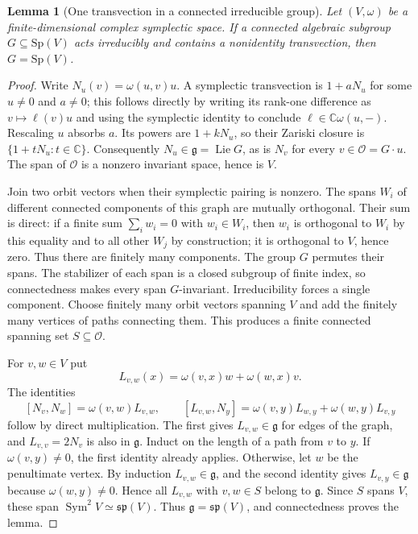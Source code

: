 \documentclass[11pt,a4paper]{article}
\newtheorem{lemma}[theorem]{Lemma}
\theoremstyle{definition}
\theoremstyle{remark}
\numberwithin{equation}{section}
\begin{document}
\begin{lemma}[One transvection in a connected irreducible group]
\label{p6:fe:transvection}
Let $(V,\omega)$ be a finite-dimensional complex symplectic space.
If a connected algebraic subgroup $G\subseteq\mathrm{Sp}(V)$ acts
irreducibly and contains a nonidentity transvection, then
$G=\mathrm{Sp}(V)$.
\end{lemma}
\begin{proof}
Write $N_u(v)=\omega(u,v)u$. A symplectic transvection is
$1+aN_u$ for some $u\ne0$ and $a\ne0$; this follows directly by
writing its rank-one difference as $v\mapsto\ell(v)u$ and using
the symplectic identity to conclude $\ell\in\mathbb C\omega(u,-)$.
Rescaling $u$ absorbs $a$. Its powers are $1+kN_u$, so their
Zariski closure is $\{1+tN_u:t\in\mathbb C\}$.
Consequently $N_u\in\mathfrak g=\operatorname{Lie}G$, as is
$N_v$ for every $v\in\mathcal O=G\cdot u$.
The span of $\mathcal O$ is a nonzero invariant space, hence is $V$.

Join two orbit vectors when their symplectic pairing is nonzero.
The spans $W_i$ of different connected components of this graph
are mutually orthogonal. Their sum is direct: if a finite sum
$\sum_iw_i=0$ with $w_i\in W_i$, then $w_i$ is orthogonal to
$W_i$ by this equality and to all other $W_j$ by construction;
it is orthogonal to $V$, hence zero. Thus there are finitely many
components. The group $G$ permutes their spans. The stabilizer of
each span is a closed subgroup of finite index, so connectedness
makes every span $G$-invariant. Irreducibility forces a single
component. Choose finitely many orbit vectors spanning $V$ and
add the finitely many vertices of paths connecting them. This
produces a finite connected spanning set $S\subseteq\mathcal O$.

For $v,w\in V$ put
\[
 L_{v,w}(x)=\omega(v,x)w+\omega(w,x)v.
\]
The identities
\[
 [N_v,N_w]=\omega(v,w)L_{v,w},\qquad
 [L_{v,w},N_y]=\omega(v,y)L_{w,y}+\omega(w,y)L_{v,y}
 \tag{T}
\]
follow by direct multiplication. The first gives $L_{v,w}\in
\mathfrak g$ for edges of the graph, and $L_{v,v}=2N_v$ is also
in $\mathfrak g$. Induct on the length of a path from $v$ to $y$.
If $\omega(v,y)\ne0$, the first identity already applies. Otherwise,
let $w$ be the penultimate vertex. By induction $L_{v,w}\in
\mathfrak g$, and the second identity gives $L_{v,y}\in\mathfrak g$
because $\omega(w,y)\ne0$. Hence all $L_{v,w}$ with $v,w\in S$
belong to $\mathfrak g$. Since $S$ spans $V$, these span
$\operatorname{Sym}^2V\simeq\mathfrak{sp}(V)$. Thus
$\mathfrak g=\mathfrak{sp}(V)$, and connectedness proves the lemma.
\end{proof}
\end{document}
